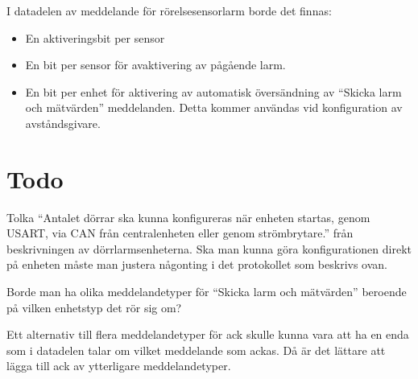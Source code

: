 \documentclass[a4paper]{article}
\begin{document}
I datadelen av meddelande för rörelsesensorlarm borde det finnas:
\begin{itemize}
	\item En aktiveringsbit per sensor
	\item En bit per sensor för avaktivering av pågående larm.
	\item En bit per enhet för aktivering av automatisk översändning av “Skicka larm och mätvärden” meddelanden. Detta kommer användas vid konfiguration av avståndsgivare.
\end{itemize}

\section*{Todo}
\label{sec:todo}
Tolka “Antalet dörrar ska kunna konfigureras när enheten startas, genom USART, via CAN från centralenheten eller genom strömbrytare.” från beskrivningen av dörrlarmsenheterna. Ska man kunna göra konfigurationen direkt på enheten måste man justera någonting i det protokollet som beskrivs ovan.

Borde man ha olika meddelandetyper för “Skicka larm och mätvärden” beroende på vilken enhetstyp det rör sig om?

Ett alternativ till flera meddelandetyper för ack skulle kunna vara att ha en enda som i datadelen talar om vilket meddelande som ackas. Då är det lättare att lägga till ack av ytterligare meddelandetyper.


%
%
\end{document}
